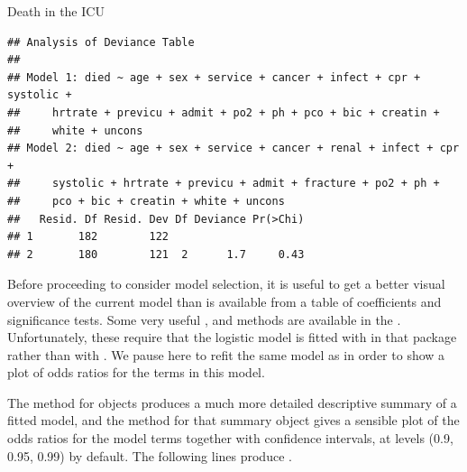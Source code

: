 \documentclass[11pt]{book}
\renewenvironment{knitrout}{\small\renewcommand{\baselinestretch}{.85}}{} %
\begin{document}
\begin{Example}[icu1]{Death in the ICU}
\begin{knitrout}\footnotesize
{}\color{fgcolor}\begin{kframe}
\begin{alltt}
 \hlkwb{<-}  \hlopt{~}  \hlopt{-}  \hlopt{-} 
 \hlstd{=}\hlstd{)}
\end{alltt}
\begin{verbatim}
## Analysis of Deviance Table
## 
## Model 1: died ~ age + sex + service + cancer + infect + cpr + systolic + 
##     hrtrate + previcu + admit + po2 + ph + pco + bic + creatin + 
##     white + uncons
## Model 2: died ~ age + sex + service + cancer + renal + infect + cpr + 
##     systolic + hrtrate + previcu + admit + fracture + po2 + ph + 
##     pco + bic + creatin + white + uncons
##   Resid. Df Resid. Dev Df Deviance Pr(>Chi)
## 1       182        122                     
## 2       180        121  2      1.7     0.43
\end{verbatim}
\end{kframe}
\end{knitrout}

Before proceeding to consider model selection, it is useful to get a better
visual overview of the current model than is available from a table
of coefficients and significance tests.  
Some very useful ,  and 
methods are available in the .
Unfortunately, these require that the logistic model is 
fitted with  in that package rather than with .
We pause here to refit the same model as  in order to
show a plot of odds ratios for the terms in this model.

\begin{knitrout}
\color{fgcolor}\begin{kframe}
\begin{alltt}
 \hlkwb{<-} \hlstd{(ICU[,}\hlopt{-}\hlstd{])}
\hlstd{(}\hlstd{=}\hlstd{)}
 \hlkwb{<-}  \hlopt{~}  
 \hlkwb{<-}  \hlopt{~}  \hlopt{-}  \hlopt{-} 
\end{alltt}
\end{kframe}
\end{knitrout}
The  method for  objects produces a much more detailed
descriptive summary of a fitted model, and the  method for that summary object
gives a sensible plot of the odds ratios for the model terms together with confidence
intervals, at levels (0.9, 0.95, 0.99) by default.  The following lines produce
.


\end{Example}
\end{document}
